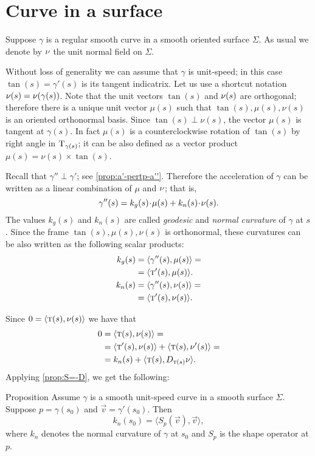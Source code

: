 

\section*{Curve in a surface}

Suppose $\gamma$ is a regular smooth curve in a smooth oriented surface $\Sigma$.
As usual we denote by $\nu$ the unit normal field on $\Sigma$.

Without loss of generality we can assume that $\gamma$ is unit-speed;
in this case $\tan(s)=\gamma'(s)$ is its tangent indicatrix.
Let us use a shortcut notation $\nu(s)=\nu(\gamma(s))$.
Note that the unit vectors $\tan(s)$ and $\nu(s)$ are orthogonal;
therefore there is a unique unit vector $\mu(s)$ such that 
$\tan(s),\mu(s),\nu(s)$ is an oriented orthonormal basis.
Since $\tan(s)\perp\nu(s)$, the vector $\mu(s)$ is tangent at $\gamma(s)$.
In fact $\mu(s)$ is a counterclockwise rotation of $\tan(s)$ by right angle in $\mathrm{T}_{\gamma(s)}$; 
it can be also defined as a vector product $\mu(s)=\nu(s)\times \tan(s)$. %

Recall that $\gamma''\perp \gamma'$; see \ref{prop:a'-pertp-a''}.
Therefore the acceleration of $\gamma$ can be written as a linear combination of $\mu$ and $\nu$;
that is,
\[\gamma''(s)=k_g(s)\cdot \mu(s)+k_n(s)\cdot\Norm(s).\]
The values $k_g(s)$ and $k_n(s)$ are called \emph{geodesic} and \emph{normal curvature} of $\gamma$ at $s$.
Since the frame $\tan(s),\mu(s),\nu(s)$ is orthonormal, these curvatures can be also written as the following scalar products:
\begin{align*}
k_g(s)&=\langle \gamma''(s),\mu(s)\rangle
=
\\
&=\langle \textsc{t}'(s),\mu(s)\rangle.
\\
k_n(s)&=\langle \gamma''(s),\nu(s)\rangle=
\\
&=\langle \textsc{t}'(s),\nu(s)\rangle.
\end{align*}

Since $0=\langle \textsc{t}(s),\nu(s)\rangle$ we have 
that 
\begin{align*}
0&=\langle \textsc{t}(s),\nu(s)\rangle=
\\
&=\langle \textsc{t}'(s),\nu(s)\rangle+\langle \textsc{t}(s),\nu'(s)\rangle=
\\
&=k_n(s)+\langle \textsc{t}(s),D_{\textsc{t}(s)}\nu\rangle.
\end{align*}
Applying \ref{prop:S=-D},  we get the following:

\begin{thm}{Proposition}\label{prop:normal-shape}
Assume $\gamma$ is a smooth unit-speed curve in a smooth surface $\Sigma$.
Suppose $p=\gamma(s_0)$ and $\vec v=\gamma'(s_0)$.
Then 
\[k_n(s_0)=\langle S_p(\vec v),\vec v\rangle,\]
where $k_n$ denotes the normal curvature of $\gamma$ at $s_0$ and $S_p$ is the shape operator at $p$.
\end{thm}

